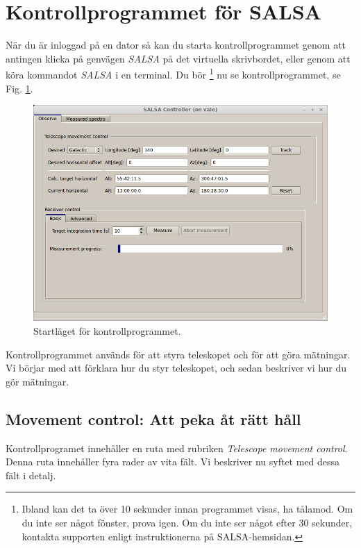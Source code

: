 \section{Kontrollprogrammet för SALSA}
\label{sect-control}
När du är inloggad på en dator så kan du starta kontrollprogrammet
genom att antingen klicka på genvägen \emph{SALSA} på det virtuella
skrivbordet, eller genom att köra kommandot \emph{SALSA} i en terminal.  
Du bör \footnote{Ibland kan det ta över 10 sekunder innan programmet visas,
	ha tålamod. Om du inte ser något fönster, prova igen. Om du inte ser något
	efter 30 sekunder, kontakta supporten enligt instruktionerna på SALSA-hemsidan.} 
	nu se kontrollprogrammet, se Fig. \ref{fig:controlstart}. 
\begin{figure}[ht]
\begin{center}
\includegraphics[width=\textwidth]{../figures/Controller_start.png}
\end{center}
\caption{Startläget för kontrollprogrammet.}
\label{fig:controlstart}
\end{figure}
Kontrollprogrammet används för att styra teleskopet och för att göra mätningar. 
Vi börjar med att förklara hur du styr teleskopet, och sedan beskriver vi hur
du gör mätningar. 

\subsection{Movement control: Att peka åt rätt håll}
Kontrollprogramet innehåller en ruta med rubriken \emph{Telescope movement control}. 
Denna ruta innehåller fyra rader av vita fält. Vi beskriver nu syftet med dessa fält
i detalj. 

